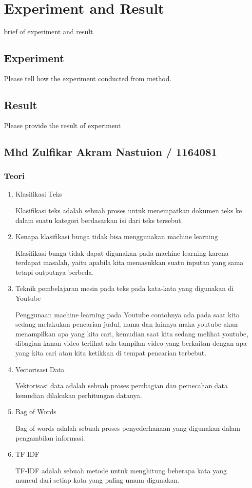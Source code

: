 
\chapter{Experiment and Result}
brief of experiment and result.
\section{Experiment}
Please tell how the experiment conducted from method.

\section{Result}
Please provide the result of experiment

\section{Mhd Zulfikar Akram Nastuion / 1164081}
\subsection{Teori}
\begin{enumerate}
\item Klasifikasi Teks
\par
Klasifikasi teks adalah sebuah proses untuk menempatkan dokumen teks ke dalam suatu kategori berdasarkan isi dari teks tersebut. 
\item Kenapa klasifikasi bunga tidak bisa menggunakan machine learning
\par
Klasifikasi bunga tidak dapat digunakan pada machine learning karena terdapat masalah, yaitu apabila kita memasukkan suatu inputan yang sama tetapi outputnya berbeda.
\item  Teknik pembelajaran mesin pada teks pada kata-kata yang digunakan di Youtube
\par
Penggunaan machine learning pada Youtube contohnya ada pada saat kita sedang melakukan pencarian judul, nama dan lainnya maka youtube akan menampilkan apa yang kita cari, kemudian saat kita sedang melihat youtube, dibagian kanan video terlihat ada tampilan video yang berkaitan dengan apa yang kita cari atau kita ketikkan di tempat pencarian terbebut.
\item Vectorisasi Data
\par
Vektorisasi data adalah sebuah proses pembagian dan pemecahan data kemudian dilakukan perhitungan datanya.
\item Bag of Words
\par
Bag of words adalah sebuah proses penyederhanaan yang digunakan dalam pengambilan informasi.
\item TF-IDF
\par
TF-IDF adalah sebuah metode untuk menghitung beberapa kata yang muncul dari setiap kata yang paling umum digunakan.
\end{enumerate}

